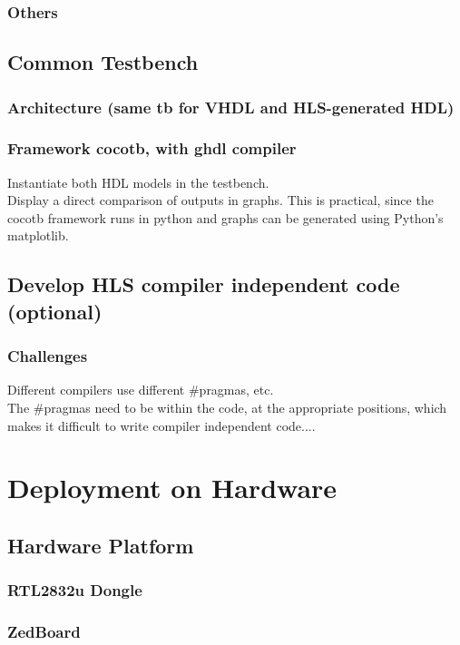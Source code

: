     \subsection{Others}

  \section{Common Testbench}
    \subsection{Architecture (same tb for VHDL and HLS-generated HDL)}
    \subsection{Framework cocotb, with ghdl compiler}
        Instantiate both HDL models in the testbench.\\
        Display a direct comparison of outputs in graphs. This is practical, since the cocotb framework runs in python and graphs can be generated using Python's matplotlib.

  \section{Develop HLS compiler independent code (optional)}
    \subsection{Challenges}
     Different compilers use different \#pragmas, etc.\\
     The \#pragmas need to be within the code, at the appropriate positions, which makes it difficult to write compiler independent code....


\chapter{Deployment on Hardware}
  \section{Hardware Platform}
    \subsection{RTL2832u Dongle}
    \subsection{ZedBoard}
